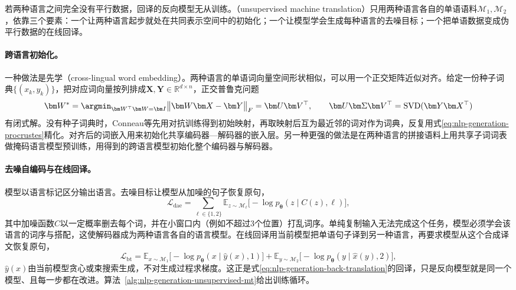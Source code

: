 若两种语言之间完全没有平行数据，回译的反向模型无从训练。（unsupervised machine translation）只用两种语言各自的单语语料$\mathcal M_1,\mathcal M_2$，依靠三个要素\cite{nlp-gen-lample2018unsupervised,nlp-gen-artetxe2018unsupervised,nlp-gen-lample2018phrase}：一个让两种语言起步就处在共同表示空间中的初始化；一个让模型学会生成每种语言的去噪目标；一个把单语数据变成伪平行数据的在线回译。

\paragraph{跨语言初始化。}一种做法是先学（cross-lingual word embedding）。两种语言的单语词向量空间形状相似，可以用一个正交矩阵近似对齐。给定一份种子词典$\{(x_k,y_k)\}$，把对应词向量按列排成$\bm X,\bm Y\in\mathbb R^{d\times n}$，正交普鲁克问题
\begin{equation}
  \bm W^\ast=\argmin_{\bm W^{\top}\bm W=\bm I}\bigl\|\bm W\bm X-\bm Y\bigr\|_F
  =\bm U\bm V^{\top},\qquad \bm U\bm\Sigma\bm V^{\top}=\operatorname{SVD}(\bm Y\bm X^{\top})
  \label{eq:nlp-generation-procrustes}
\end{equation}
有闭式解。没有种子词典时，Conneau等先用对抗训练得到初始映射，再取映射后互为最近邻的词对作为词典，反复用式\eqref{eq:nlp-generation-procrustes}精化。对齐后的词嵌入用来初始化共享编码器—解码器的嵌入层。另一种更强的做法是在两种语言的拼接语料上用共享子词词表做掩码语言模型预训练，用得到的跨语言模型初始化整个编码器与解码器。

\paragraph{去噪自编码与在线回译。}模型以语言标记区分输出语言。去噪目标让模型从加噪的句子恢复原句，
\begin{equation}
  \mathcal L_{\mathrm{dae}}=\sum_{\ell\in\{1,2\}}\mathbb E_{z\sim\mathcal M_\ell}\bigl[-\log p_{\bm\theta}(z\mid C(z),\ell)\bigr],
  \label{eq:nlp-generation-unsup-dae}
\end{equation}
其中加噪函数$C$以一定概率删去每个词，并在小窗口内（例如不超过3个位置）打乱词序。单纯复制输入无法完成这个任务，模型必须学会该语言的词序与搭配，这使解码器成为两种语言各自的语言模型。在线回译用当前模型把单语句子译到另一种语言，再要求模型从这个合成译文恢复原句，
\begin{equation}
  \mathcal L_{\mathrm{bt}}=\mathbb E_{x\sim\mathcal M_1}\bigl[-\log p_{\bm\theta}(x\mid\hat y(x),1)\bigr]
  +\mathbb E_{y\sim\mathcal M_2}\bigl[-\log p_{\bm\theta}(y\mid\hat x(y),2)\bigr],
  \label{eq:nlp-generation-unsup-bt}
\end{equation}
$\hat y(x)$由当前模型贪心或束搜索生成，不对生成过程求梯度。这正是式\eqref{eq:nlp-generation-back-translation}的回译，只是反向模型就是同一个模型、且每一步都在改进。算法~\ref{alg:nlp-generation-unsupervised-mt}给出训练循环。

